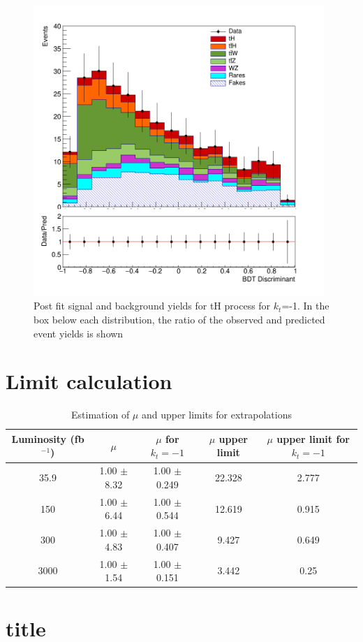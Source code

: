 \begin{figure}
	\centering
	\includegraphics[width=11cm,height=11cm]{Chapter4/simple-kt-1.png}
	\caption{Post fit signal and background yields for tH process for $k_t$=-1.
		In the box below each distribution, the ratio of the observed and predicted event yields is shown}
\end{figure}

\section{Limit calculation}


\begin{table}[ht!]
	\caption{Estimation of $\mu$ and upper limits  for extrapolations}
	\begin{tabular}{|c|c|c|c|c|}
		\hline
		Luminosity (fb$^{-1}$)	&$\mu$ &$\mu$ for $k_t=-1$ &$\mu$ upper limit &$\mu$ upper limit for $k_t=-1$ \\
		\hline
		35.9 & 1.00 $\pm$  8.32 & 1.00 $\pm$  0.249&	22.328 & 2.777   \\
		\hline
		150& 1.00 $\pm$  6.44 & 1.00 $\pm$  0.544  &12.619 &0.915 \\
		\hline
		300&1.00 $\pm$  4.83 &1.00 $\pm$  0.407 & 9.427&0.649 \\
		\hline
		3000&1.00 $\pm$  1.54 & 1.00 $\pm$  0.151&	 3.442 & 0.25
		\\
		\hline
	\end{tabular}
\end{table}

\section{title}